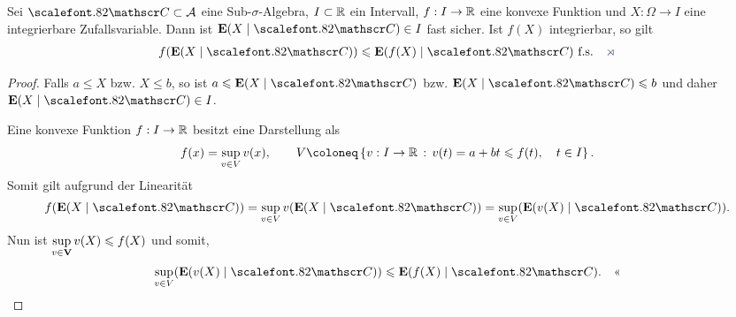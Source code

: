 \begin{prop}
\label{prop:10.7}
Sei ${\CC} \subset {\AA}$ eine Sub-$\sigma$-Algebra, $I \subset \mathbb{R}$ ein
Intervall, $f: I \to \mathbb{R}$ eine konvexe Funktion und $X:\Omega\to I$ eine
integrierbare Zufallsvariable. Dann ist $\E(X\mid {\CC}) \in I$ fast sicher.
Ist $f(X)$ integrierbar, so gilt
\begin{align*}
f(\E(X\mid {\CC})) \le \E(f(X)\mid {\CC}) \fs\fishhere
\end{align*}
\end{prop}
\begin{proof}
Falls $a \le X$ bzw. $X\le b$, so ist $a\le \E(X\mid\CC)$ bzw. $\E(X\mid\CC)
\le b$ und daher $\E(X\mid\CC)\in I$.

Eine konvexe Funktion $f:I\to\mathbb{R}$ besitzt eine Darstellung als
\begin{align*}
f(x) = \sup_{v\in V} v(x),\qquad V\defl \setdef{v: I\to\R}{v(t)=a+bt\le f(t),\quad
t\in I}.
\end{align*}
Somit gilt aufgrund der Linearität
\begin{align*}
f(\E(X\mid\CC)) = \sup\limits_{v\in V}v(\E(X\mid\CC))
= \sup\limits_{v\in V}(\E(v(X)\mid\CC)).
\end{align*}
Nun ist $\sup\limits_{v\in\textbf{V}} v(X)\leqslant f(X)$ und somit,
\begin{align*}
\sup\limits_{v\in V}(\E(v(X)\mid\CC)) \le \E(f(X)\mid\CC).\qedhere
\end{align*}
\end{proof}
